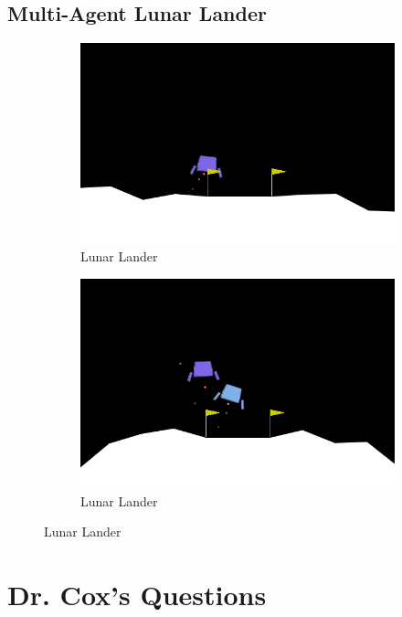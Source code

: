 \documentclass[12pt,letterpaper]{exam}
\begin{document}
\subsection*{Multi-Agent Lunar Lander}
\label{sec:ma-lander}




\begin{figure}[h]
	\begin{subfigure}{.5\textwidth}
		\centering
		\includegraphics[width=.8\linewidth]{single_lander.png}
		\caption{Lunar Lander}
	\end{subfigure}
	\begin{subfigure}{.5\textwidth}
		\centering
		\includegraphics[width=.8\linewidth]{dual_lander.png}
		\caption{Lunar Lander}
	\end{subfigure}
	\label{fig:landers}
\end{figure}









\section{Dr. Cox's Questions}
\end{document}
